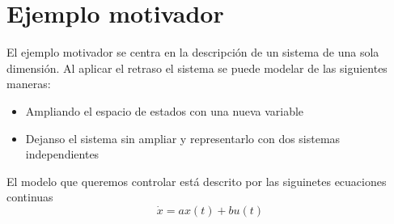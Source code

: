 \section{Ejemplo motivador}
El ejemplo motivador se centra en la descripción de un sistema de una sola dimensión. Al aplicar el retraso el sistema se puede modelar de las siguientes maneras:
\begin{itemize}
\item Ampliando el espacio de estados con una nueva variable
\item Dejanso el sistema sin ampliar y representarlo con dos sistemas independientes
\end{itemize}


El modelo que queremos controlar está descrito por las siguinetes ecuaciones continuas
\begin{equation}
\dot{x}=ax(t)+bu(t)
\end{equation}
